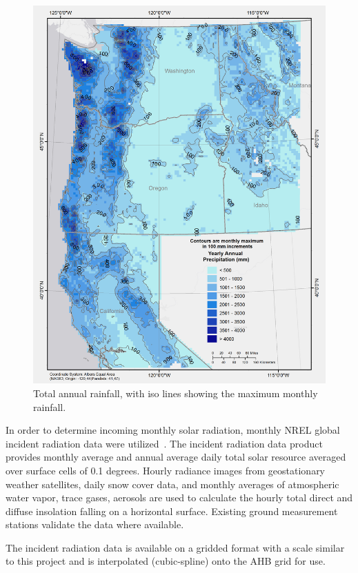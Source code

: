 \documentclass[preprint,12pt]{elsarticle}
\begin{document}
\begin{figure}[hp]
  \centering  
  \includegraphics[width=1.0\linewidth]{precip}  
\caption{Total annual rainfall, with iso lines showing the maximum monthly rainfall.}
  \label{fig:precip}
\end{figure}

In order to determine incoming monthly solar radiation, monthly
\acf{NREL} global incident radiation data were
utilized~\cite{perez2002new,nrel-l48-ghi}.  The incident radiation data product
provides monthly average and annual average daily total solar resource
averaged over surface cells of 0.1 degrees.  Hourly radiance images
from geostationary weather satellites, daily snow cover data, and
monthly averages of atmospheric water vapor, trace gases, aerosols are
used to calculate the hourly total direct and diffuse insolation
falling on a horizontal surface.  Existing ground measurement stations
validate the data where available.

The incident radiation data is available on a gridded format with a
scale similar to this project and is interpolated (cubic-spline)
onto the \ac{AHB} grid for use.
\end{document}
